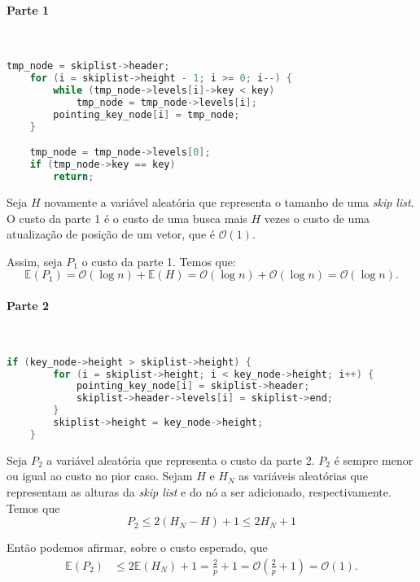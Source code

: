 \documentclass[paper=a4, fontsize=11pt]{scrartcl} %
\numberwithin{equation}{section}
\numberwithin{figure}{section}
\numberwithin{table}{section}
\numberwithin{definition}{section}
\numberwithin{theorem}{section}
\numberwithin{property}{section}
\numberwithin{proposition}{section}
\newcommand{\cO}{\ensuremath{\mathcal{O}}}
\renewcommand{\sl}{\textit{skip list}\xspace}
\newcommand{\Exp}{\ensuremath{{\mathbb{E}}}\xspace}
\begin{document}
\paragraph{Parte 1}
\ \\
\begin{lstlisting}[caption=Inserção Parte 1., language=C]
    tmp_node = skiplist->header;                        
    for (i = skiplist->height - 1; i >= 0; i--) {
        while (tmp_node->levels[i]->key < key)
            tmp_node = tmp_node->levels[i];
        pointing_key_node[i] = tmp_node;
    }                                                    

    tmp_node = tmp_node->levels[0];
    if (tmp_node->key == key)
        return;                                          
\end{lstlisting}

Seja $H$ novamente a variável aleatória que representa o tamanho de uma \sl.
O custo da parte 1 é o custo de uma busca mais $H$ vezes o custo de uma atualização de posição de um vetor,
que é $\cO(1)$.

Assim, seja $P_1$ o custo da parte 1. Temos que:
$$
  \Exp(P_1) = \cO(\log n) + \Exp(H) = \cO(\log n) + \cO(\log n) = \cO(\log n).
$$


\paragraph{Parte 2}
\ \\

\begin{lstlisting}[caption=Inserção Parte 2., language=C]
    if (key_node->height > skiplist->height) {            
        for (i = skiplist->height; i < key_node->height; i++) {
            pointing_key_node[i] = skiplist->header;
            skiplist->header->levels[i] = skiplist->end;
        }
        skiplist->height = key_node->height;
    }                                                      
\end{lstlisting}

Seja $P_2$ a variável aleatória que representa o custo da parte 2. $P_2$ é sempre menor ou igual ao custo no pior
caso. Sejam $H$ e $H_N$ as variáveis aleatórias que representam as alturas da \sl e do nó a ser adicionado,
respectivamente. Temos que
$$
P_2 \leq 2(H_N - H) + 1 \leq 2 H_N + 1 
$$

Então podemos afirmar, sobre o custo esperado, que
\begin{align*}
\Exp(P_2) &\leq 2\Exp(H_N) + 1 = \frac{2}{p} + 1  = \cO \left( \frac{2}{p} + 1 \right) = \cO(1).
\end{align*}
\end{document}
